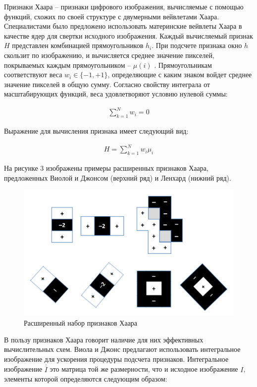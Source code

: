 Признаки Хаара -- признаки цифрового изображения, вычисляемые с помощью функций, схожих по своей структуре с двумерными вейвлетами Хаара. Специалистами было предложено использовать материнские вейвлеты Хаара в качестве ядер для свертки исходного изображения. Каждый вычисляемый признак $H$ представлен комбинацией прямоугольников $h_i$. При подсчете признака окно $h$ скользит по изображению, и вычисляется среднее значение пикселей, покрываемых каждым прямоугольником -- $\mu(i)$ . Прямоугольникам соответствуют веса $w_i \in \{−1, +1\}$, определяющие с каким знаком войдет среднее значение пикселей в общую сумму. Согласно свойству интеграла от масштабирующих функций, веса удовлетворяют условию нулевой суммы:

\begin{gather}
\sum\limits_{k=1}^N w_i=0
\end{gather}

Выражение для вычисления признака имеет следующий вид:

\begin{gather}
H = \sum\limits_{k=1}^N w_i \mu_i
\end{gather}

На рисунке 3 изображены примеры расширенных признаков Хаара, предложенных Виолой и Джонсом (верхний ряд) и Ленхард (нижний ряд).

\begin{figure}[h!]
\centering
\includegraphics[scale=0.45]{res/pic003}
\caption{Расширенный набор признаков Хаара}
\end{figure}

В пользу признаков Хаара говорит наличие для них эффективных вычислительных схем. Виола и Джонс предлагают использовать интегральное изображение для ускорения процедуры подсчета признаков. Интегральное изображение $\overline{\overline{I}}$ это матрица той же размерности, что и исходное изображение $I$, элементы которой определяются следующим образом:

